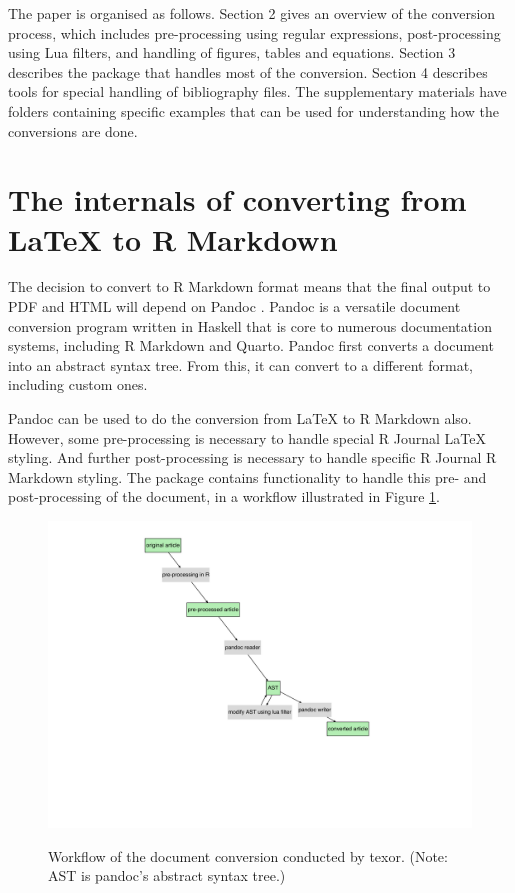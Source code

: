 The paper is organised as follows. Section 2 gives an overview of the conversion process, which includes pre-processing using regular expressions, post-processing using Lua filters, and handling of figures, tables and equations. Section 3 describes the  package that handles most of the conversion. Section 4 describes tools for special handling of bibliography files. The supplementary materials have folders containing specific examples that can be used for understanding how the conversions are done.

\section{The internals of converting from LaTeX to R Markdown}\label{internals}

The decision to convert to R Markdown format means that the final output to PDF and HTML will depend on Pandoc \citep{pandoc}. Pandoc is a versatile document conversion program written in Haskell that is core to numerous documentation systems, including R Markdown and Quarto. Pandoc first converts a document into an abstract syntax tree. From this, it can convert to a different format, including custom ones.

Pandoc can be used to do the conversion from LaTeX to R Markdown also. However, some pre-processing is necessary to handle special R Journal LaTeX styling. And further post-processing is necessary to handle specific R Journal R Markdown styling. The  package contains functionality to handle this pre- and post-processing of the document, in a workflow illustrated in Figure \ref{fig:wf-fig}.

\begin{figure}

{\centering \includegraphics[width=1\linewidth,alt={Flow diagram showing original article pre-processed in R passed to pandoc which creates the AST and modifies using many lua filters then passed to pacdoc writer to produce the converted article.}]{figures/wf} 

}

\caption{Workflow of the document conversion conducted by texor. (Note: AST is pandoc's abstract syntax tree.)}\label{fig:wf-fig}
\end{figure}

